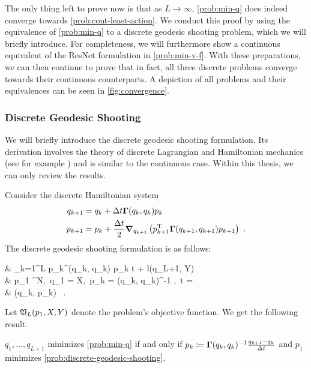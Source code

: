 

The only thing left to prove now is that as $L \rightarrow \infty$, \cref{prob:min-q} does indeed converge towards \cref{prob:cont-least-action}.
We conduct this proof by using the equivalence of \cref{prob:min-q} to a discrete geodesic shooting problem, which we will briefly introduce.
For completeness, we will furthermore show a continuous equivalent of the ResNet formulation in \cref{prob:min-v-f}.
With these preparations, we can then continue to prove that in fact, all three discrete problems converge towards their continuous counterparts.
A depiction of all problems and their equivalences can be seen in \cref{fig:convergence}.

\subsubsection{Discrete Geodesic Shooting}

We will briefly introduce the discrete geodesic shooting formulation.
Its derivation involves the theory of discrete Lagrangian and Hamiltonian mechanics (see for example \cite{west04}) and is similar to the continuous case.
Within this thesis, we can only review the results.

Consider the discrete Hamiltonian system
\begin{equation}
	\label{eq:discrete-hamiltonian-system}
	\begin{split}
		q_{k+1} &= q_k + \Delta t \mathbf{\Gamma}(q_k, q_k) p_k\\
		p_{k+1} &= p_k + \frac{\Delta t}{2} \grad_{q_{k+1}} \left(p_{k+1}^{\mathrm{T}} \mathbf{\Gamma}(q_{k+1}, q_{k+1}) p_{k+1}\right)\ .
	\end{split}
\end{equation}
The discrete geodesic shooting formulation is as follows:
\begin{problem}
	\label{prob:discrete-geodesic-shooting}
	\begin{cases}
		 &  \sum_{k=1}^L p_k^\T \bGamma(q_k, q_k) p_k \Delta t + l(q_{L+1}, Y)\\
		 & p_1 \in \cX^N,\ q_1 = X,\ p_k = \bGamma(q_k, q_k)^{-1} ,\ \Delta t =  \\
		& (q_k, p_k) \ .
	\end{cases}
\end{problem}
Let $\mathfrak{V}_L(p_1, X, Y)$ denote the problem's objective function.
We get the following result.
\begin{theorem}
	\label{theo:discrete-shooting-min-q-equivalence}
	$q_1, \dots, q_{L+1}$ minimizes \cref{prob:min-q} if and only if $p_k \coloneqq \mathbf{\Gamma}(q_k, q_k)^{-1} \frac{q_{k+1} - q_k}{\Delta t}$ and $p_1$ minimizes \cref{prob:discrete-geodesic-shooting}.
\end{theorem}

